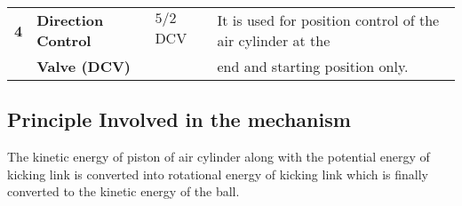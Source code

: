 \begin{table}[h]
\begin{tabular}{|c|l|l|l|}
                            &                               &                                       &                                                                  \\ \hline 
            \textbf{4}      & \textbf{Direction Control}    & \textbf{$5/2$} DCV                    & It is used for position control of the air cylinder at the       \\
                            & \textbf{Valve (DCV)}          &                                       & end and starting position only.                                  \\ \hline    \hline   
        \end{tabular}
    \end{table}

    \subsection{Principle Involved in the mechanism}
        The kinetic energy of piston of air cylinder along with the potential energy of kicking link is converted
        into rotational energy of kicking link which is finally converted to the kinetic energy of the ball.

